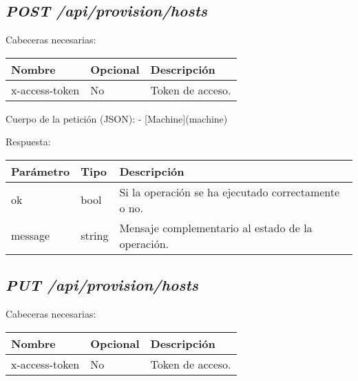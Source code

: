 \subsection{\textit{POST /api/provision/hosts}}

Cabeceras necesarias:
\begin{table}[h!]
	\centering
	\begin{adjustbox}{max width=\textwidth}
	\begin{tabular}{|l|l|l|}
		\hline
		Nombre & Opcional & Descripción \\ \hline
		x-access-token & No & Token de acceso. \\ \hline
	\end{tabular}
\end{adjustbox}
\end{table}

Cuerpo de la petición (JSON):
- [Machine](machine)

Respuesta:
\begin{table}[!h]
	\centering
	\begin{adjustbox}{max width=\textwidth}
	\begin{tabular}{|l|l|l|}
		\hline
		Parámetro & Tipo & Descripción \\ \hline
		ok & bool & Si la operación se ha ejecutado correctamente o no. \\ \hline
		message & string & Mensaje complementario al estado de la operación. \\ \hline
	\end{tabular}
\end{adjustbox}
\end{table}


\subsection{\textit{PUT /api/provision/hosts}}

Cabeceras necesarias:
\begin{table}[h!]
	\centering
	\begin{adjustbox}{max width=\textwidth}
	\begin{tabular}{|l|l|l|}
		\hline
		Nombre & Opcional & Descripción \\ \hline
		x-access-token & No & Token de acceso. \\ \hline
	\end{tabular}
\end{adjustbox}
\end{table}

